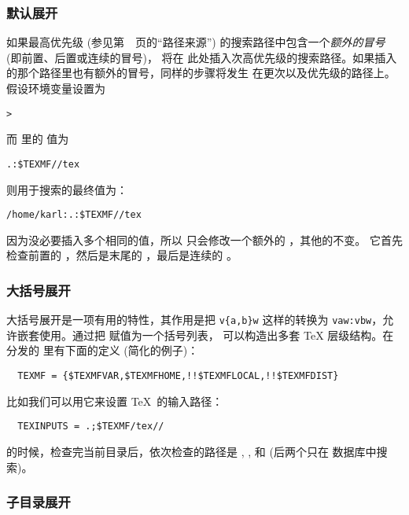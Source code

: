 \documentclass{article}
\begin{document}
\subsubsection{默认展开}
\label{sec:default-expansion}

如果最高优先级 (参见第~\pageref{sec:path-sources}~页的``路径来源'')
的搜索路径中包含一个\emph{额外的冒号} (即前置、后置或连续的冒号)，\KPS{} 将在
此处插入次高优先级的搜索路径。如果插入的那个路径里也有额外的冒号，同样的步骤将发生
在更次以及优先级的路径上。假设环境变量设置为

\begin{alltt}
  > 
\end{alltt}

而  里的  值为

\begin{alltt}
  .:\$TEXMF//tex
\end{alltt}

则用于搜索的最终值为：

\begin{alltt}
  /home/karl:.:\$TEXMF//tex
\end{alltt}

因为没必要插入多个相同的值，所以 \KPS{} 只会修改一个额外的 \samp{:}，其他的不变。
它首先检查前置的 \samp{:}，然后是末尾的 \samp{:}，最后是连续的 \samp{:}。

\subsubsection{大括号展开}
\label{sec:brace-expansion}

大括号展开是一项有用的特性，其作用是把 \verb+v{a,b}w+ 这样的转换为
\verb+vaw:vbw+，允许嵌套使用。通过把  赋值为一个括号列表，
可以构造出多套 \TeX{} 层级结构。在分发的  里有下面的定义
(简化的例子)：
\begin{verbatim}
  TEXMF = {$TEXMFVAR,$TEXMFHOME,!!$TEXMFLOCAL,!!$TEXMFDIST}
\end{verbatim}
比如我们可以用它来设置 \TeX\ 的输入路径：
\begin{verbatim}
  TEXINPUTS = .;$TEXMF/tex//
\end{verbatim}
的时候，检查完当前目录后，依次检查的路径是
, , 
和  (后两个只在  数据库中搜索)。

\subsubsection{子目录展开}
\label{sec:subdirectory-expansion}
\end{document}
